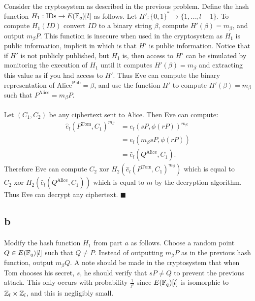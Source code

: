 \documentclass[letterpaper,12pt,oneside,onecolumn]{article}
\begin{document}
\paragraph{}
Consider the cryptosystem as described in the previous problem. Define the hash function $H_1: \text{IDs} \rightarrow E(\mathbb{F}_q)[l]$ as follows. Let $H' : \{0,1\}^* \rightarrow \{1,\dots, l-1\}$. To compute $H_1(ID)$ convert $ID$ to a binary string $\beta$, compute $H'(\beta) = m_\beta$, and output $m_\beta P$. This function is insecure when used in the cryptosystem as $H_1$ is public information, implicit in which is that $H'$ is public information. Notice that if $H'$ is not publicly published, but $H_1$ is, then access to $H'$ can be simulated by monitoring the execution of $H_1$ until it computes $H'(\beta) = m_\beta$ and extracting this value as if you had access to $H'$. Thus Eve can compute the binary representation of $\text{Alice}^\text{Pub} = \beta$, and use the function $H'$ to compute $H'(\beta) = m_\beta$ such that $P^\text{Alice} = m_\beta P$.
\paragraph{}
Let $(C_1,C_2)$ be any ciphertext sent to Alice. Then Eve can compute:
\begin{align*}
\hat{e}_l(P^\text{Tom}, C_1)^{m_\beta} &= e_l(sP, \phi(rP))^{m_\beta} \\
&= e_l(m_\beta sP, \phi(rP)) \\
&= \hat{e}_l(Q^\text{Alice}, C_1).
\end{align*}
Therefore  Eve can compute $C_2\text{ xor } H_2(\hat{e}_l(P^\text{Tom}, C_1)^{m_\beta})$ which is equal to $C_2\text{ xor } H_2(\hat{e}_l(Q^\text{Alice}, C_1))$ which is equal to $m$ by the decryption algorithm. Thus Eve can decrypt any ciphertext. $\blacksquare$
\subsection*{b}
\paragraph{}
Modify the hash function $H_1$ from part $a$ as follows. Choose a random point $Q \in E(\mathbb{F}_q)[l]$ such that $Q \neq P$. Instead of outputting $m_\beta P$ as in the previous hash function, output $m_\beta Q$. A note should be made in the cryptosystem that when Tom chooses his secret, $s$, he should verify that $sP \neq Q$ to prevent the previous attack. This only occurs with probability $\frac{1}{l^2}$ since $E(\mathbb{F}_q)[l]$ is isomorphic to $\mathbb{Z}_l \times \mathbb{Z}_l$, and this is negligibly small.
\end{document}
